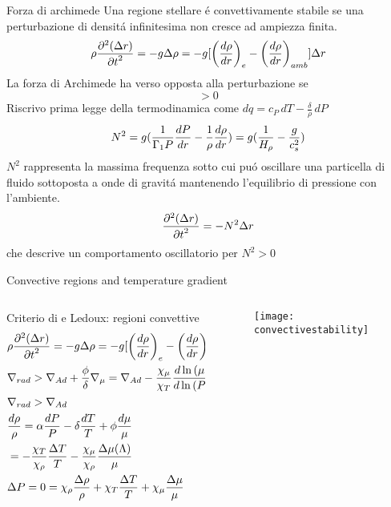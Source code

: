 \begin{wordonframe}{Forza di archimede}
Una regione stellare \'e convettivamente stabile se una perturbazione di densit\'a infinitesima non cresce ad ampiezza finita.
\begin{equation*}\label{eq:buoyanc yEOM}
\rho\PtwoDy{t}{(\Delta r)}=-g\Delta\rho=-g[\Dcvar{\TDy{r}{\rho}}{e}-\Dcvar{\TDy{r}{\rho}}{amb}]\Delta r
\end{equation*}
La forza di Archimede ha verso opposta alla perturbazione se
\begin{equation*} 
[\Dcvar{\TDy{r}{\rho}}{e}-\Dcvar{\TDy{r}{\rho}}{amb}]>0
\end{equation*}
Riscrivo prima legge della termodinamica come $dq=c_P\,dT-\frac{\delta}{\rho}\,dP$
\begin{equation*} 
N^2=g(\frac{1}{\Gamma_1P}\TDy{r}{P}-\frac{1}{\rho}\TDy{r}{\rho})=g(\frac{1}{\densityscale{}}-\frac{g}{c_s^2})\label{eq:bvfs}
\end{equation*}
$N^2$ rappresenta la massima frequenza sotto cui pu\'o oscillare una particella di fluido sottoposta a onde di gravit\'a mantenendo l'equilibrio di pressione con l'ambiente.
\begin{equation*}
\PtwoDy{t}{(\Delta r)}=-N^2\Delta r
\end{equation*} 
che descrive un comportamento oscillatorio per $N^2>0$
\end{wordonframe}

\begin{frame}{Convective regions and temperature gradient}
\begin{columns}[T]
	\begin{column}{0.6\textwidth}
\begin{block}{Criterio di \sch e Ledoux: regioni convettive}
	\begin{align*}
	&\rho\PtwoDy{t}{(\Delta r)}=-g\Delta\rho=-g[\Dcvar{\TDy{r}{\rho}}{e}-\Dcvar{\TDy{r}{\rho}}{amb}]\Delta r\\
	&\nrad{}>\nad+\frac{\phi}{\delta}\nmu{}=\nad-\frac{\chi_{\mu}}{\chi_T}\TDly{(P)}{(\mu)}\\
	&\nrad{}>\nad\\
	&\frac{d\rho}{\rho}=\alpha\frac{dP}{P}-\delta\frac{dT}{T}+\phi\frac{d\mu}{\mu}\\
	&=-\frac{\chi_T}{\chi_{\rho}}\frac{\Delta T}{T}-\frac{\chi_{\mu}}{\chi_{\rho}}\frac{\Delta\mu(\Lambda)}{\mu}\\
	&\Delta P=0=\chi_{\rho}\frac{\Delta\rho}{\rho}+\chi_T\frac{\Delta T}{T}+\chi_{\mu}\frac{\Delta\mu}{\mu}
	\end{align*}
\end{block}
	\end{column}
	\begin{column}{0.4\textwidth}
\begin{figure}[!ht]
	\texttt{[image: convectivestability]}\label{fig:convectivestability}
\end{figure}
\end{column}\end{columns}
\end{frame}

